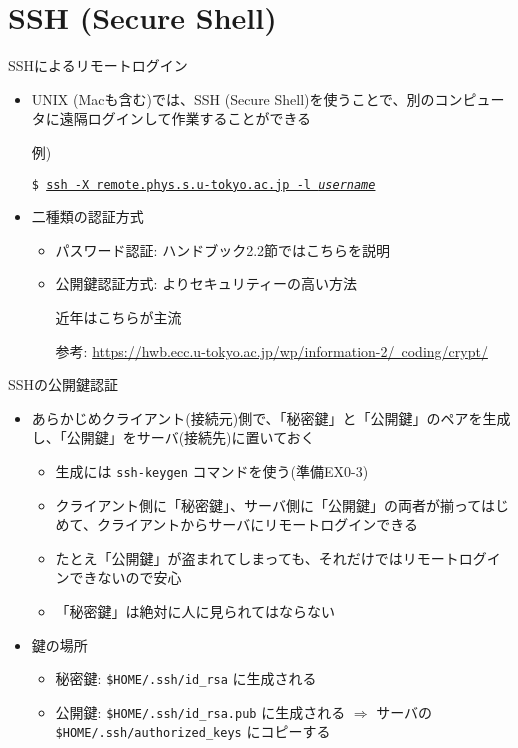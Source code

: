 \section{SSH (Secure Shell)}

\begin{frame}[t,fragile]{SSHによるリモートログイン}
  \begin{itemize}
    \setlength{\itemsep}{1em}
  \item UNIX (Macも含む)では、SSH (Secure Shell)を使うことで、別のコンピュータに遠隔ログインして作業することができる

    例)
    
    {\tt \$ \underline{ssh -X remote.phys.s.u-tokyo.ac.jp -l {\it username}}}
  \item 二種類の認証方式
    \begin{itemize}
    \item パスワード認証: ハンドブック2.2節ではこちらを説明
    \item 公開鍵認証方式: よりセキュリティーの高い方法

      近年はこちらが主流

      参考: \href{https://hwb.ecc.u-tokyo.ac.jp/wp/information-2/coding/crypt/}{https://hwb.ecc.u-tokyo.ac.jp/wp/information-2/\ coding/crypt/}
    \end{itemize}
  \end{itemize}
\end{frame}

\begin{frame}[t,fragile]{SSHの公開鍵認証}
  \begin{itemize}
    \setlength{\itemsep}{1em}
  \item あらかじめクライアント(接続元)側で、「秘密鍵」と「公開鍵」のペアを生成し、「公開鍵」をサーバ(接続先)に置いておく
    \begin{itemize}
    \item 生成には {\tt ssh-keygen} コマンドを使う(準備EX0-3)
    \item クライアント側に「秘密鍵」、サーバ側に「公開鍵」の両者が揃ってはじめて、クライアントからサーバにリモートログインできる
    \item たとえ「公開鍵」が盗まれてしまっても、それだけではリモートログインできないので安心
    \item 「秘密鍵」は絶対に人に見られてはならない
    \end{itemize}
  \item 鍵の場所
    \begin{itemize}
    \item 秘密鍵: {\tt \$HOME/.ssh/id\_rsa} に生成される
    \item 公開鍵: {\tt \$HOME/.ssh/id\_rsa.pub} に生成される $\Rightarrow$
      サーバの {\tt \$HOME/.ssh/authorized\_keys} にコピーする
    \end{itemize}
  \end{itemize}
\end{frame}
